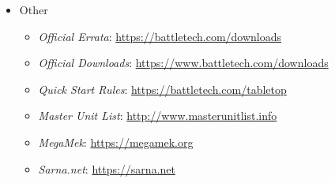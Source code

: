 \begin{itemize}
  \begin{itemize}

    \item \emph{\href{https://battletech.com/wp-content/uploads/sites/6/2025/07/CAT35600_ChaosCampaign_Rulebook.pdf}{BattleTech: Chaos Campaign}}

    \item \emph{\href{https://store.catalystgamelabs.com/products/battletech-chaos-campaign-succession-wars}{BattleTech: Chaos Campaign: Succession Wars}}

    \item \emph{\href{https://store.catalystgamelabs.com/products/battletech-mercenaries-box-set}{BattleTech: Mercenaries box set}}

    \item \emph{\href{https://store.catalystgamelabs.com/products/battletech-hot-spots-hinterlands}{BattleTech: Hot Spots: Hinterlands}}

    \item \emph{\href{https://store.catalystgamelabs.com/products/battletech-hot-spots-draconis-reach}{BattleTech: Hot Spots: Draconis Reach}}

  \end{itemize}

  \item Other

  \begin{itemize}

    \item \emph{Official Errata}: \href{https://battletech.com/downloads}{https://battletech.com/downloads}

    \item \emph{Official Downloads}: \href{https://www.battletech.com/downloads}{https://www.battletech.com/downloads}

    \item \emph{Quick Start Rules}: \href{https://battletech.com/tabletop}{https://battletech.com/tabletop}

    \item \emph{Master Unit List}: \href{http://www.masterunitlist.info}{http://www.masterunitlist.info}

    \item \emph{MegaMek}: \href{https://megamek.org}{https://megamek.org}

    \item \emph{Sarna.net}: \href{https://sarna.net}{https://sarna.net}

  \end{itemize}

\end{itemize}

